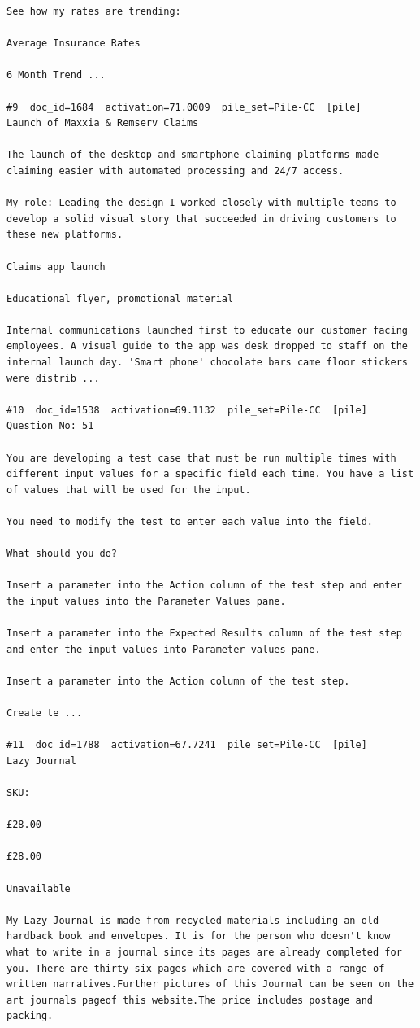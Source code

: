\begin{verbatim}
See how my rates are trending:

Average Insurance Rates

6 Month Trend ...

#9  doc_id=1684  activation=71.0009  pile_set=Pile-CC  [pile]
Launch of Maxxia & Remserv Claims

The launch of the desktop and smartphone claiming platforms made claiming easier with automated processing and 24/7 access.

My role: Leading the design I worked closely with multiple teams to develop a solid visual story that succeeded in driving customers to these new platforms.

Claims app launch

Educational flyer, promotional material

Internal communications launched first to educate our customer facing employees. A visual guide to the app was desk dropped to staff on the internal launch day. 'Smart phone' chocolate bars came floor stickers were distrib ...

#10  doc_id=1538  activation=69.1132  pile_set=Pile-CC  [pile]
Question No: 51

You are developing a test case that must be run multiple times with different input values for a specific field each time. You have a list of values that will be used for the input.

You need to modify the test to enter each value into the field.

What should you do?

Insert a parameter into the Action column of the test step and enter the input values into the Parameter Values pane.

Insert a parameter into the Expected Results column of the test step and enter the input values into Parameter values pane.

Insert a parameter into the Action column of the test step.

Create te ...

#11  doc_id=1788  activation=67.7241  pile_set=Pile-CC  [pile]
Lazy Journal

SKU:

£28.00

£28.00

Unavailable

My Lazy Journal is made from recycled materials including an old hardback book and envelopes. It is for the person who doesn't know what to write in a journal since its pages are already completed for you. There are thirty six pages which are covered with a range of written narratives.Further pictures of this Journal can be seen on the art journals pageof this website.The price includes postage and packing.


\end{verbatim}
